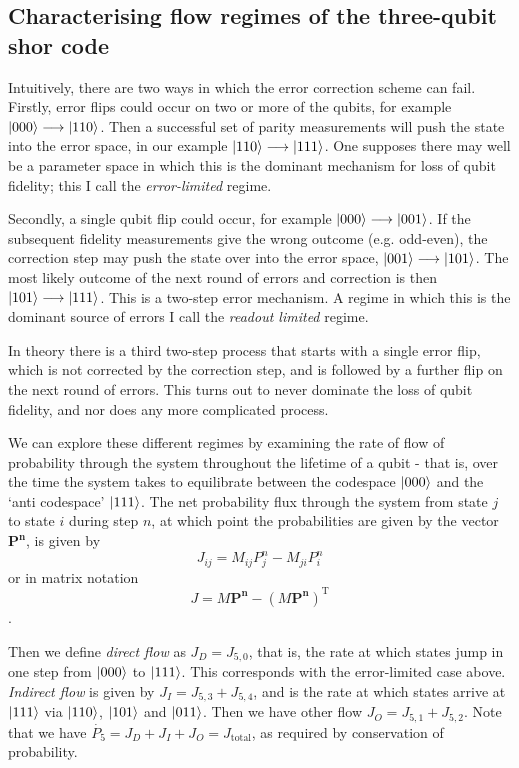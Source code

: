\documentclass{report}
\begin{document}
\begin{appendices}
\chapter{Characterising flow regimes of the three-qubit shor code}
\label{appendix:flowanalysis}
Intuitively, there are two ways in which the error correction scheme can fail. Firstly, error flips could occur on two or more of the qubits, for example $\ket{000} \longrightarrow \ket{110}$. Then a successful set of parity measurements will push the state into the error space, in our example $\ket{110} \longrightarrow \ket{111}$. One supposes there may well be a parameter space in which this is the dominant mechanism for loss of qubit fidelity; this I call the \textit{error-limited} regime.

Secondly, a single qubit flip could occur, for example $\ket{000} \longrightarrow \ket{001}$. If the subsequent fidelity measurements give the wrong outcome (e.g. odd-even), the correction step may push the state over into the error space, $\ket{001} \longrightarrow \ket{101}$. The most likely outcome of the next round of errors and correction is then $\ket{101} \longrightarrow \ket{111}$. This is a two-step error mechanism. A regime in which this is the dominant source of errors I call the \textit{readout limited} regime.

In theory there is a third two-step process that starts with a single error flip, which is not corrected by the correction step, and is followed by a further flip on the next round of errors. This turns out to never dominate the loss of qubit fidelity, and nor does any more complicated process.

We can explore these different regimes by examining the rate of flow of probability through the system throughout the lifetime of a qubit - that is, over the time the system takes to equilibrate between the codespace $\ket{000}$ and the `anti codespace' $\ket{111}$. The net probability flux through the system from state $j$ to state $i$ during step $n$, at which point the probabilities are given by the vector $\mathbf{P^n}$, is given by
\begin{equation*}
    J_{ij} = M_{ij}P^n_j - M_{ji} P^n_i
\end{equation*}
or in matrix notation
\begin{equation*}
    J = M\mathbf{P^n} - (M \mathbf{P^n})^\mathrm{T}
\end{equation*}.

Then we define \textit{direct flow} as $J_D = J_{5,0}$, that is, the rate at which states jump in one step from $\ket{000}$ to $\ket{111}$. This corresponds with the error-limited case above. \textit{Indirect flow} is given by $J_I = J_{5,3} + J_{5,4}$, and is the rate at which states arrive at $\ket{111}$ via $\ket{110}$, $\ket{101}$ and $\ket{011}$. Then we have other flow $J_O = J_{5,1} + J_{5,2}$. Note that we have $\dot{P_5} = J_D + J_I + J_O = J_\mathrm{total}$, as required by conservation of probability.


\end{appendices}
\end{document}
